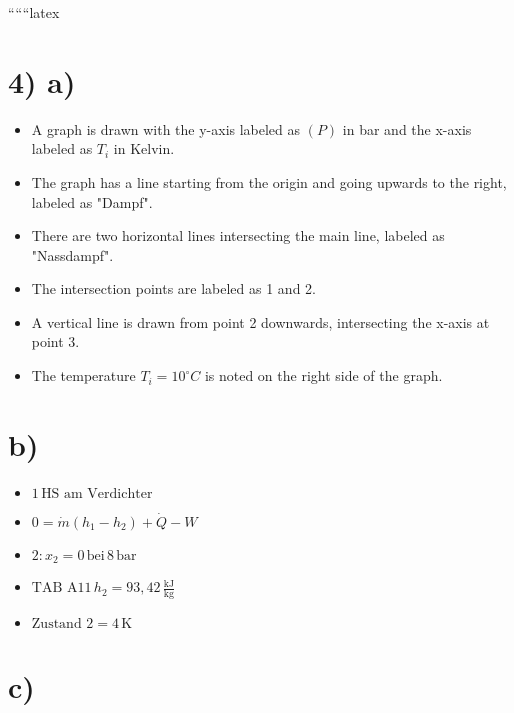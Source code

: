 
``````latex


\section*{4) a)}

\begin{itemize}
    \item A graph is drawn with the y-axis labeled as \( (P) \) in bar and the x-axis labeled as \( T_i \) in Kelvin.
    \item The graph has a line starting from the origin and going upwards to the right, labeled as "Dampf".
    \item There are two horizontal lines intersecting the main line, labeled as "Nassdampf".
    \item The intersection points are labeled as 1 and 2.
    \item A vertical line is drawn from point 2 downwards, intersecting the x-axis at point 3.
    \item The temperature \( T_i = 10^\circ C \) is noted on the right side of the graph.
\end{itemize}

\section*{b)}

\begin{itemize}
    \item \( 1 \, \text{HS am Verdichter} \)
    \item \( 0 = \dot{m} (h_1 - h_2) + \dot{Q} - W \)
    \item \( 2: x_2 = 0 \, \text{bei} \, 8 \, \text{bar} \)
    \item \( \text{TAB A11} \, h_2 = 93,42 \, \frac{\text{kJ}}{\text{kg}} \)
    \item \( \text{Zustand 2} = 4 \, \text{K} \)
\end{itemize}

\section*{c)}

